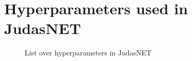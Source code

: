 \chapter{Hyperparameters used in JudasNET}
\label{app:judasnethyperparams}

\begin{figure}[h]
    \centering
    
    \caption{List over hyperparameters in JudasNET}
    \label{fig:judashyperparams}
\end{figure}
 
